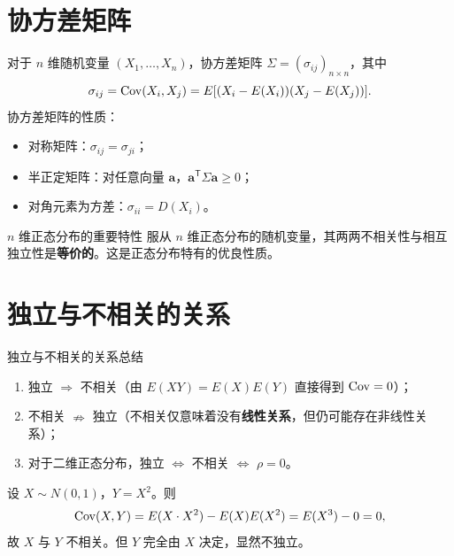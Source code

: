 \section{协方差矩阵}

对于 $n$ 维随机变量 $(X_1, \ldots, X_n)$，协方差矩阵 $\Sigma = (\sigma_{ij})_{n \times n}$，其中
\[\sigma_{ij} = \mathrm{Cov}(X_i, X_j) = E[(X_i - E(X_i))(X_j - E(X_j))].\]
协方差矩阵的性质：
\begin{itemize}
	\item 对称矩阵：$\sigma_{ij} = \sigma_{ji}$；
	\item 半正定矩阵：对任意向量 $\mathbf{a}$，$\mathbf{a}^{\mathsf{T}} \Sigma \mathbf{a} \geq 0$；
	\item 对角元素为方差：$\sigma_{ii} = D(X_i)$。
\end{itemize}

\begin{myTheorem}{$n$ 维正态分布的重要特性}
服从 $n$ 维正态分布的随机变量，其两两不相关性与相互独立性是\textbf{等价的}。这是正态分布特有的优良性质。
\end{myTheorem}

\section{独立与不相关的关系}

\begin{myTheorem}{独立与不相关的关系总结}
\begin{enumerate}
	\item 独立 $\Rightarrow$ 不相关（由 $E(XY) = E(X)E(Y)$ 直接得到 $\mathrm{Cov} = 0$）；
	\item 不相关 $\nRightarrow$ 独立（不相关仅意味着没有\textbf{线性关系}，但仍可能存在非线性关系）；
	\item 对于二维正态分布，独立 $\iff$ 不相关 $\iff$ $\rho = 0$。
\end{enumerate}
\end{myTheorem}

\begin{example}[不相关但不独立的例子]
设 $X \sim N(0,1)$，$Y = X^2$。则
\[\mathrm{Cov}(X, Y) = E(X \cdot X^2) - E(X)E(X^2) = E(X^3) - 0 = 0,\]
故 $X$ 与 $Y$ 不相关。但 $Y$ 完全由 $X$ 决定，显然不独立。
\end{example}
